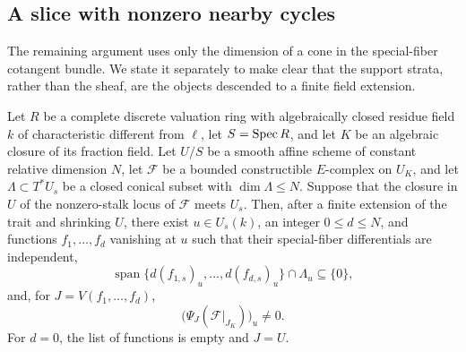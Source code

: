\subsection{A slice with nonzero nearby cycles}

The remaining argument uses only the dimension of a cone in the
special-fiber cotangent bundle.  We state it separately to make clear
that the support strata, rather than the sheaf, are the objects descended
to a finite field extension.

\begin{lemma}
\label{support:finite-slice}
Let $R$ be a complete discrete valuation ring with algebraically closed
residue field $k$ of characteristic different from $\ell$, let
$S=\operatorname{Spec} R$, and let $K$ be an algebraic closure of its fraction field.  Let $U/S$ be a smooth affine
scheme of constant
relative dimension $N$, let $\mathcal F$ be a bounded constructible
$E$-complex on $U_K$, and let
$\Lambda\subset T^*U_s$ be a closed conical subset with
$\dim\Lambda\leq N$.
Suppose that the closure in $U$ of the nonzero-stalk locus of
$\mathcal F$ meets $U_s$.
Then, after a finite extension of the trait and shrinking $U$, there
exist $u\in U_s(k)$, an integer $0\leq d\leq N$, and functions
$f_1,\ldots,f_d$ vanishing at $u$ such that their special-fiber
differentials are independent,
\[
 \operatorname{span}\{d(f_{1,s})_u,\ldots,d(f_{d,s})_u\}
       \cap\Lambda_u\subseteq\{0\},
\]
and, for $J=V(f_1,\ldots,f_d)$,
\begin{equation}
\label{eq:support-nonzero}
 \bigl(\Psi_J(\mathcal F|_{J_K})\bigr)_u\ne0.
\end{equation}
For $d=0$, the list of functions is empty and $J=U$.
\end{lemma}

